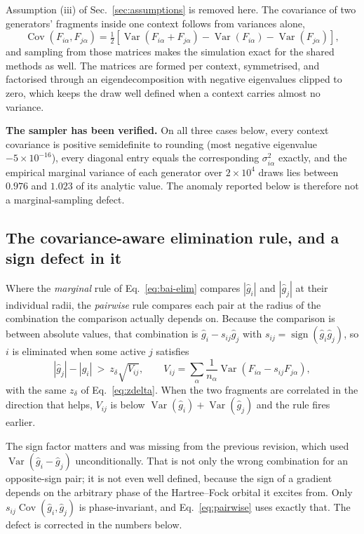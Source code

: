 \documentclass[10pt]{article}
\newcommand{\Var}{\operatorname{Var}}
\newcommand{\Cov}{\operatorname{Cov}}
\begin{document}
Assumption (iii) of Sec.~\ref{sec:assumptions} is removed here. The covariance of
two generators' fragments inside one context follows from variances alone,
\begin{equation}
  \Cov(F_{i\alpha},F_{j\alpha})
  =\tfrac12\left[\Var(F_{i\alpha}+F_{j\alpha})-\Var(F_{i\alpha})-\Var(F_{j\alpha})\right],
\end{equation}
and sampling from those matrices makes the simulation exact for the shared methods
as well. The matrices are formed per context, symmetrised, and factorised through
an eigendecomposition with negative eigenvalues clipped to zero, which keeps the
draw well defined when a context carries almost no variance.

\textbf{The sampler has been verified.} On all three cases below, every context
covariance is positive semidefinite to rounding (most negative eigenvalue
$-5\times10^{-16}$), every diagonal entry equals the corresponding $\sigma_{i\alpha}^2$
exactly, and the empirical marginal variance of each generator over $2\times10^4$
draws lies between $0.976$ and $1.023$ of its analytic value. The anomaly reported
below is therefore not a marginal-sampling defect.

\subsection{The covariance-aware elimination rule, and a sign defect in it}

Where the \emph{marginal} rule of Eq.~\eqref{eq:bai-elim} compares
$|\widehat g_i|$ and $|\widehat g_j|$ at their individual radii, the
\emph{pairwise} rule compares each pair at the radius of the combination the
comparison actually depends on. Because the comparison is between absolute
values, that combination is $\widehat g_i-s_{ij}\widehat g_j$ with
$s_{ij}=\operatorname{sign}(\widehat g_i\widehat g_j)$, so $i$ is eliminated when
some active $j$ satisfies
\begin{equation}
  |\widehat g_j|-|\widehat g_i| \ > \ z_\delta\sqrt{V_{ij}},
  \qquad
  V_{ij}=\sum_\alpha\frac{1}{n_\alpha}
         \Var\!\left(F_{i\alpha}-s_{ij}F_{j\alpha}\right),
  \label{eq:pairwise}
\end{equation}
with the same $z_\delta$ of Eq.~\eqref{eq:zdelta}. When the two fragments are
correlated in the direction that helps, $V_{ij}$ is below
$\Var(\widehat g_i)+\Var(\widehat g_j)$ and the rule fires earlier.

The sign factor matters and was missing from the previous revision, which used
$\Var(\widehat g_i-\widehat g_j)$ unconditionally. That is not only the wrong
combination for an opposite-sign pair; it is not even well defined, because the
sign of a gradient depends on the arbitrary phase of the Hartree--Fock orbital it
excites from. Only $s_{ij}\Cov(\widehat g_i,\widehat g_j)$ is phase-invariant, and
Eq.~\eqref{eq:pairwise} uses exactly that. The defect is corrected in the numbers
below.
\end{document}

